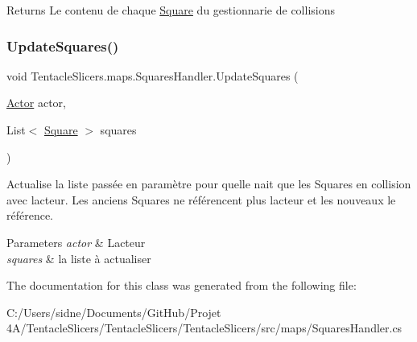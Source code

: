 \begin{DoxyReturn}{Returns}
Le contenu de chaque \hyperlink{class_tentacle_slicers_1_1maps_1_1_square}{Square} du gestionnarie de collisions 
\end{DoxyReturn}
\mbox{\label{class_tentacle_slicers_1_1maps_1_1_squares_handler_a729b67b5c51d0e676f974e83e5e1743f}} 
\subsubsection{\texorpdfstring{Update\+Squares()}{UpdateSquares()}}
{\footnotesize\ttfamily void Tentacle\+Slicers.\+maps.\+Squares\+Handler.\+Update\+Squares (\begin{DoxyParamCaption}\item[{\hyperlink{class_tentacle_slicers_1_1actors_1_1_actor}{Actor}}]{actor,  }\item[{List$<$ \hyperlink{class_tentacle_slicers_1_1maps_1_1_square}{Square} $>$}]{squares }\end{DoxyParamCaption})}



Actualise la liste passée en paramètre pour qu\textquotesingle{}elle n\textquotesingle{}ait que les Squares en collision avec l\textquotesingle{}acteur. Les anciens Squares ne référencent plus l\textquotesingle{}acteur et les nouveaux le référence. 


\begin{DoxyParams}{Parameters}
{\em actor} & L\textquotesingle{}acteur \\
\hline
{\em squares} & la liste à actualiser \\
\hline
\end{DoxyParams}


The documentation for this class was generated from the following file\+:\begin{DoxyCompactItemize}
\item 
C\+:/\+Users/sidne/\+Documents/\+Git\+Hub/\+Projet 4\+A/\+Tentacle\+Slicers/\+Tentacle\+Slicers/\+Tentacle\+Slicers/src/maps/Squares\+Handler.\+cs\end{DoxyCompactItemize}
